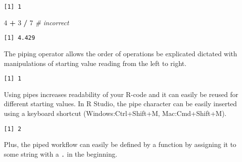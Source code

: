\documentclass[12pt,]{article}
\newenvironment{Shaded}{\begin{snugshade}}{\end{snugshade}}
\newcommand{\CommentTok}[1]{\textcolor[rgb]{0.56,0.35,0.01}{\textit{#1}}}
\newcommand{\DecValTok}[1]{\textcolor[rgb]{0.00,0.00,0.81}{#1}}
\newcommand{\NormalTok}[1]{#1}
\newcommand{\OperatorTok}[1]{\textcolor[rgb]{0.81,0.36,0.00}{\textbf{#1}}}
\newcommand{\StringTok}[1]{\textcolor[rgb]{0.31,0.60,0.02}{#1}}
\begin{document}
\begin{verbatim}
[1] 1
\end{verbatim}

\begin{Shaded}
\begin{Highlighting}[]
\DecValTok{4} \OperatorTok{+}\StringTok{ }\DecValTok{3} \OperatorTok{/}\StringTok{ }\DecValTok{7} \CommentTok{# incorrect}
\end{Highlighting}
\end{Shaded}

\begin{verbatim}
[1] 4.429
\end{verbatim}

The piping operator allows the order of operations be explicated
dictated with manipulations of starting value reading from the left to
right.

\begin{Shaded}
\end{Shaded}

\begin{verbatim}
[1] 1
\end{verbatim}

Using pipes increases readability of your R-code and it can easily be
reused for different starting values. In R Studio, the pipe character
can be easily inserted using a keyboard shortcut (Windows:Ctrl+Shift+M,
Mac:Cmd+Shift+M).

\begin{Shaded}
\end{Shaded}

\begin{verbatim}
[1] 2
\end{verbatim}

Plus, the piped workflow can easily be defined by a function by
assigning it to some string with a \texttt{.} in the beginning.
\end{document}
